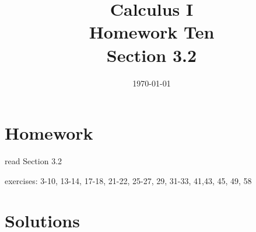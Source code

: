 \documentclass[letterpaper, landscape]{exam}
\title{Calculus I \\ Homework Ten \\ Section 3.2}
\author{}
\date{\today}
\begin{document}
  \maketitle

  \section{Homework}
    \begin{itemize*}
      \item read Section 3.2
      \item exercises: 3-10, 13-14, 17-18, 21-22, 25-27, 29, 31-33, 41,43, 45, 49, 58
    \end{itemize*}

  \ifprintanswers

  \section{Solutions}
\end{document}
